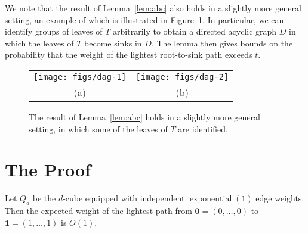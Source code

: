 \documentclass[a4paper,UKenglish]{lipics-v2016}
\DeclareMathOperator{\exponential}{exponential}
\newcommand{\zero}{\mathbf{0}}
\newcommand{\one}{\mathbf{1}}
\begin{document}
\begin{remark}
We note that the result of Lemma~\ref{lem:abc} also holds in
a slightly more general setting, an example of which is illustrated in
Figure~\ref{fig:dag}. In particular, we can identify groups
of leaves of $T$ arbitrarily to obtain a directed acyclic graph $D$ in which the
leaves of $T$ become sinks in $D$. The lemma then gives bounds on the
probability that the weight of the lightest root-to-sink path exceeds $t$.
\end{remark}

\begin{figure}
   \begin{center}
     \begin{tabular}{cc}
       \texttt{[image: figs/dag-1]} & \texttt{[image: figs/dag-2]} \\
       (a) & (b)
     \end{tabular}
   \end{center}
  \caption{The result of Lemma~\ref{lem:abc} holds in a slightly more general setting, in which some of the leaves of $T$ are identified.}
  \label{fig:dag}
\end{figure}

\section{The Proof}


\begin{theorem}
  Let $Q_d$ be the $d$-cube equipped with independent $\exponential(1)$
  edge weights.  Then the expected weight of the lightest path from $\zero=(0,\ldots,0)$
  to $\one=(1,\ldots,1)$ is $O(1)$.
\end{theorem}
\end{document}
